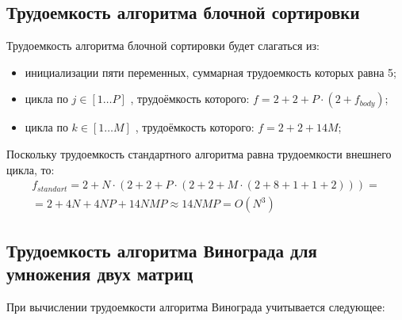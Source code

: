\clearpage

\subsection{Трудоемкость алгоритма блочной сортировки}

Трудоемкость алгоритма блочной сортировки будет слагаться из:

\begin{itemize}[label=---]
	\item инициализации пяти переменных, суммарная трудоемкость которых равна 5;
	\item цикла по $j \in [1 \ldots P]$ , трудоёмкость которого: $f = 2 + 2 + P \cdot (2 + f_{body})$;
	\item цикла по $k \in [1 \ldots M]$ , трудоёмкость которого: $f = 2 + 2 + 14M$;
\end{itemize}

Поскольку трудоемкость стандартного алгоритма равна трудоемкости внешнего цикла, то:
\begin{equation}
	\label{eq:classic}
	\begin{gathered}
		f_{standart} = 2 + N \cdot (2 + 2 + P \cdot (2 + 2 + M \cdot (2 + 8 + 1 + 1 + 2)))= \\
		= 2 + 4N + 4NP + 14NMP \approx 14NMP = O(N^3)
	\end{gathered}
\end{equation}

\subsection{Трудоемкость алгоритма Винограда для умножения двух матриц}

При вычислении трудоемкости алгоритма Винограда учитывается следующее:

